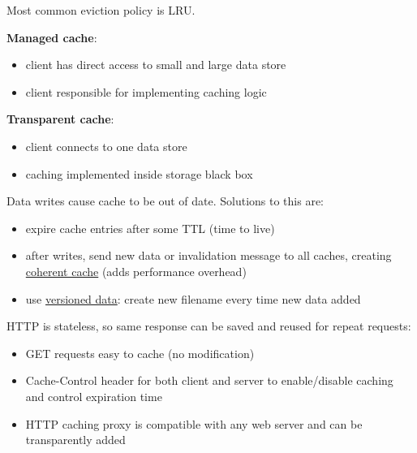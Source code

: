 \documentclass[11pt]{article}
\begin{document}
Most common eviction policy is LRU.

\textbf{Managed cache}:
\begin{itemize}
\item client has direct access to small and large data store
\item client responsible for implementing caching logic
\end{itemize}

\textbf{Transparent cache}:
\begin{itemize}
\item client connects to one data store
\item caching implemented inside storage black box
\end{itemize}

Data writes cause cache to be out of date.
Solutions to this are:
\begin{itemize}
\item expire cache entries after some TTL (time to live)
\item after writes, send new data or invalidation message to all caches,
creating \uline{coherent cache} (adds performance overhead)
\item use \uline{versioned data}: create new filename every time new data
added
\end{itemize}

HTTP is stateless, so same response can be saved and reused for
repeat requests:
\begin{itemize}
\item GET requests easy to cache (no modification)
\item Cache-Control header for both client and server to enable/disable
caching and control expiration time
\item HTTP caching proxy is compatible with any web server and can be
transparently added
\end{itemize}
\end{document}
